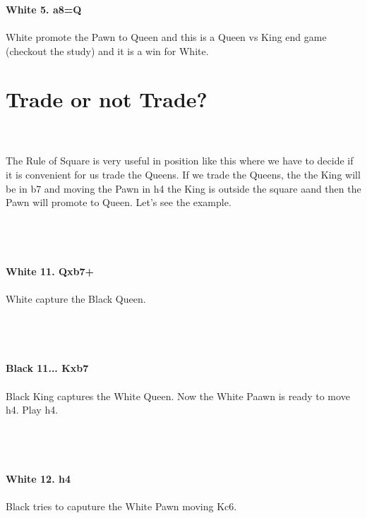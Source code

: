 \documentclass{article}
\begin{document}
\\

\\
\\
\textbf{White 5. a8=Q}\\
\\
White promote the Pawn to Queen and this is a Queen vs King end game (checkout the study) and it is a win for White.\section{ Trade or not Trade?}

\\
\\
The Rule of Square is very useful in position like this where we have to decide if it is convenient for us trade the Queens. If we trade the Queens, the the King will be in b7 and moving the Pawn in h4 the King is outside the square aand then the Pawn will promote to Queen. Let's see the example.\\\\
\\

\\
\\
\textbf{White 11. Qxb7+}\\
\\
White capture the Black Queen.\\\\
\\

\\
\\
\textbf{Black 11... Kxb7}\\
\\
Black King captures the White Queen. Now the White Paawn is ready to move h4. Play h4.\\\\
\\

\\
\\
\textbf{White 12. h4}\\
\\
Black tries to caputure the White Pawn moving Kc6.\\\\
\\
\end{document}
